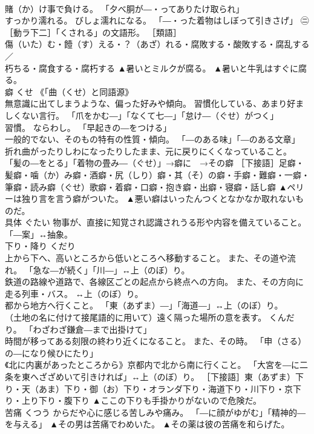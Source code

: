 \documentclass[8pt]{extreport}
\begin{document}
\begin{CJK}{UTF8}{min}
\\	賭（か）け事で負ける。 「夕べ胴が―・ってありたけ取られ」 
\\	すっかり濡れる。 びしょ濡れになる。 「―・った着物はしぼって引きさげ」 ㊁［動ラ下二］「くされる」の文語形。 ［類語］ 
\\	傷（いた）む・饐（す）える・？（あざ）れる・腐敗する・酸敗する・腐乱する／
\\	朽ちる・腐食する・腐朽する	▲暑いとミルクが腐る。 ▲暑いと牛乳はすぐに腐る。
\\	癖	くせ	《「曲（くせ）と同語源》 
\\	無意識に出てしまうような、偏った好みや傾向。 習慣化している、あまり好ましくない言行。 「爪をかむ―」「なくて七―」「怠け―（ぐせ）がつく」 
\\	習慣。 ならわし。 「早起きの―をつける」 
\\	一般的でない、そのもの特有の性質・傾向。 「―のある味」「―のある文章」 
\\	折れ曲がったりしわになったりしたまま、元に戻りにくくなっていること。 「髪の―をとる」「着物の畳み―（ぐせ）」→癖に　→その癖 ［下接語］足癖・髪癖・噛（か）み癖・酒癖・尻（しり）癖・其（そ）の癖・手癖・難癖・一癖・筆癖・読み癖（ぐせ）歌癖・着癖・口癖・抱き癖・出癖・寝癖・話し癖	▲ペリーは独り言を言う癖がついた。 ▲悪い癖はいったんつくとなかなか取れないものだ。
\\	具体	ぐたい	物事が、直接に知覚され認識されうる形や内容を備えていること。 「―案」↔抽象。	
\\	下り・降り	くだり	
\\	上から下へ、高いところから低いところへ移動すること。 また、その道や流れ。 「急な―が続く」「川―」↔上（のぼ）り。 
\\	鉄道の路線や道路で、各線区ごとの起点から終点への方向。 また、その方向に走る列車・バス。 ↔上（のぼ）り。 
\\	都から地方へ行くこと。 「東（あずま）―」「海道―」↔上（のぼ）り。 
\\	（土地の名に付けて接尾語的に用いて）遠く隔った場所の意を表す。 くんだり。 「わざわざ鎌倉―まで出掛けて」 
\\	時間が移ってある刻限の終わり近くになること。 また、その時。 「申（さる）の―になり候ひにたり」 
\\	《北に内裏があったところから》京都内で北から南に行くこと。 「大宮を―に二条を東へざざめいて引きければ」↔上（のぼ）り。 ［下接語］東（あずま）下り・天（あま）下り・御（お）下り・オランダ下り・海道下り・川下り・京下り・上り下り・腹下り	▲ここの下りも手掛かりがないので危険だ。
\\	苦痛	くつう	からだや心に感じる苦しみや痛み。 「―に顔がゆがむ」「精神的―を与える」	▲その男は苦痛でわめいた。 ▲その薬は彼の苦痛を和らげた。

\end{CJK}
\end{document}
